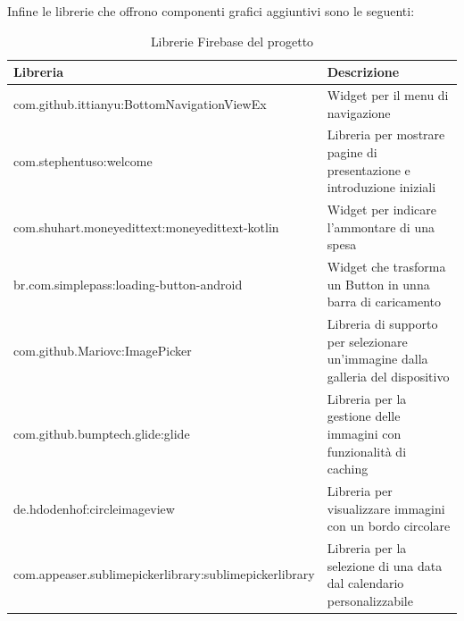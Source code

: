 Infine le librerie che offrono componenti grafici aggiuntivi sono le seguenti:
\begin{table}[!hb]
\begin{center}
\begin{tabular}{|l|p{7cm}|}
    \hline
\textbf{Libreria} & \textbf{Descrizione}\\ \hline
com.github.ittianyu:BottomNavigationViewEx  & Widget per il menu di navigazione  \\ \hline
com.stephentuso:welcome  & Libreria per mostrare pagine di presentazione e introduzione iniziali \\ \hline
com.shuhart.moneyedittext:moneyedittext-kotlin  & Widget per indicare l'ammontare di una spesa \\ \hline
br.com.simplepass:loading-button-android  & Widget che trasforma un Button in unna barra di caricamento  \\ \hline
com.github.Mariovc:ImagePicker  & Libreria di supporto per selezionare un'immagine dalla galleria del dispositivo  \\ \hline
com.github.bumptech.glide:glide & Libreria per la gestione delle immagini con funzionalità di caching \\ \hline
de.hdodenhof:circleimageview  & Libreria per visualizzare immagini con un bordo circolare \\ \hline
com.appeaser.sublimepickerlibrary:sublimepickerlibrary & Libreria per la selezione di una data dal calendario personalizzabile  \\ \hline
\end{tabular}
\caption[Librerie Firebase del progetto]{Librerie Firebase del progetto}\label{tab:Librerie Firebase del progetto}
\end{center}
\end{table}
